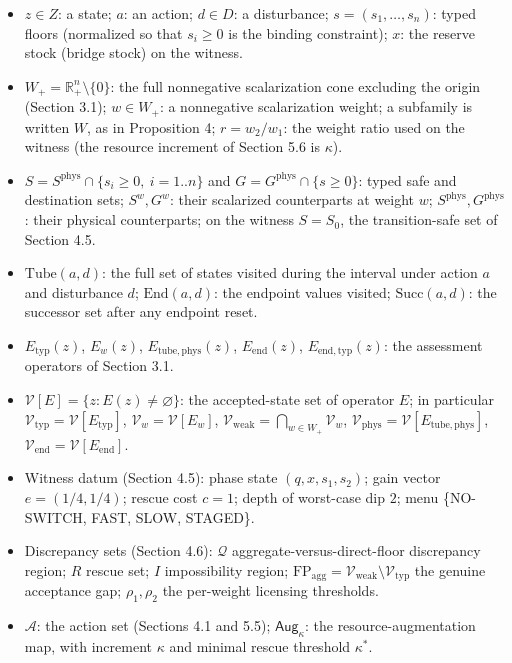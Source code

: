 \documentclass[3p,11pt]{elsarticle}
\providecommand{\tightlist}{\setlength{\itemsep}{0pt}\setlength{\parskip}{0pt}}
\begin{document}
\begin{itemize}
\tightlist
\item
  \(z \in Z\): a state; \(a\): an action; \(d \in D\): a disturbance; \(s = (s_1, \ldots, s_n)\): typed floors (normalized so that \(s_i \ge 0\) is the binding constraint); \(x\): the reserve stock (bridge stock) on the witness.
\item
  \(W_+ = \mathbb{R}^n_+ \setminus \{0\}\): the full nonnegative scalarization cone excluding the origin (Section 3.1); \(w \in W_+\): a nonnegative scalarization weight; a subfamily is written \(W\), as in Proposition 4; \(r = w_2 / w_1\): the weight ratio used on the witness (the resource increment of Section 5.6 is \(\kappa\)).
\item
  \(S = S^{\mathrm{phys}} \cap \{ s_i \ge 0,\ i = 1..n \}\) and \(G = G^{\mathrm{phys}} \cap \{ s \ge 0 \}\): typed safe and destination sets; \(S^w, G^w\): their scalarized counterparts at weight \(w\); \(S^{\mathrm{phys}}, G^{\mathrm{phys}}\): their physical counterparts; on the witness \(S = S_0\), the transition-safe set of Section 4.5.
\item
  \(\mathrm{Tube}(a,d)\): the full set of states visited during the interval under action \(a\) and disturbance \(d\); \(\mathrm{End}(a,d)\): the endpoint values visited; \(\mathrm{Succ}(a,d)\): the successor set after any endpoint reset.
\item
  \(E_{\mathrm{typ}}(z)\), \(E_w(z)\), \(E_{\mathrm{tube,phys}}(z)\), \(E_{\mathrm{end}}(z)\), \(E_{\mathrm{end,typ}}(z)\): the assessment operators of Section 3.1.
\item
  \(\mathcal{V}[E] = \{ z : E(z) \neq \varnothing \}\): the accepted-state set of operator \(E\); in particular \(\mathcal{V}_{\mathrm{typ}} = \mathcal{V}[E_{\mathrm{typ}}]\), \(\mathcal{V}_w = \mathcal{V}[E_w]\), \(\mathcal{V}_{\mathrm{weak}} = \bigcap_{w \in W_+} \mathcal{V}_w\), \(\mathcal{V}_{\mathrm{phys}} = \mathcal{V}[E_{\mathrm{tube,phys}}]\), \(\mathcal{V}_{\mathrm{end}} = \mathcal{V}[E_{\mathrm{end}}]\).
\item
  Witness datum (Section 4.5): phase state \((q, x, s_1, s_2)\); gain vector \(e = (1/4, 1/4)\); rescue cost \(c = 1\); depth of worst-case dip \(2\); menu \{NO-SWITCH, FAST, SLOW, STAGED\}.
\item
  Discrepancy sets (Section 4.6): \(\mathcal{Q}\) aggregate-versus-direct-floor discrepancy region; \(R\) rescue set; \(I\) impossibility region; \(\mathrm{FP}_{\mathrm{agg}} = \mathcal{V}_{\mathrm{weak}} \setminus \mathcal{V}_{\mathrm{typ}}\) the genuine acceptance gap; \(\rho_1, \rho_2\) the per-weight licensing thresholds.
\item
  \(\mathcal{A}\): the action set (Sections 4.1 and 5.5); \(\mathsf{Aug}_\kappa\): the resource-augmentation map, with increment \(\kappa\) and minimal rescue threshold \(\kappa^*\).
\end{itemize}
\end{document}
